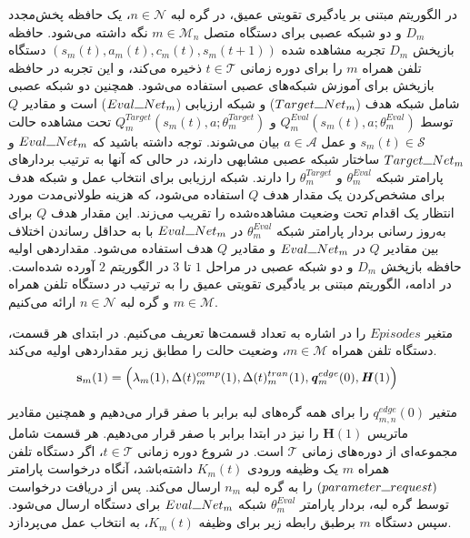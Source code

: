 در الگوریتم مبتنی بر یادگیری تقویتی عمیق، در گره لبه $n \in \mathcal{N}$، یک حافظه پخش‌مجدد $D_m$ و دو شبکه عصبی برای دستگاه متصل $m \in \mathcal{M}_n$ نگه داشته می‌شود. حافظه بازپخش $D_m$ تجربه مشاهده شده $(s_m(t), a_m(t), c_m(t), s_m(t+1))$ دستگاه تلفن همراه $m$ را برای دوره زمانی $t \in \mathcal{T}$ ذخیره می‌کند، و این تجربه در حافظه بازپخش برای آموزش شبکه‌های عصبی استفاده می‌شود. همچنین دو شبکه عصبی شامل شبکه هدف ($Target\rule{0.25cm}{0.15mm}Net_m$) و شبکه ارزیابی ($Eval\rule{0.25cm}{0.15mm}Net_m$) است و مقادیر $Q$ توسط $Q_m^{Eval}(s_m(t), a; \theta_m^{Eval})$ و $Q_m^{Target}(s_m(t), a; \theta_m^{Target})$ تحت مشاهده حالت $s_m(t) \in \mathcal{S}$ و عمل $a \in \mathcal{A}$ بیان می‌شوند. توجه داشته باشید که $Eval\rule{0.25cm}{0.15mm}Net_m$ و $Target\rule{0.25cm}{0.15mm}Net_m$ ساختار شبکه عصبی مشابهی دارند، در حالی که آنها به ترتیب بردارهای پارامتر شبکه $\theta_m^{Eval}$ و $ \theta_m^{Target}$ را دارند. شبکه ارزیابی برای انتخاب عمل و شبکه هدف برای مشخص‌کردن یک مقدار هدف $Q$ استفاده می‌شود، که هزینه طولانی‌مدت مورد انتظار یک اقدام تحت وضعیت مشاهده‌شده را تقریب می‌زند. این مقدار هدف $Q$ برای به‌روز رسانی بردار پارامتر شبکه $\theta_m^{Eval}$ در  $Eval\rule{0.25cm}{0.15mm}Net_m$ با به حداقل رساندن اختلاف بین مقادیر $Q$ در $Eval\rule{0.25cm}{0.15mm}Net_m$ و مقادیر $Q$ هدف استفاده می‌شود. مقداردهی اولیه حافظه بازپخش $D_m$ و دو شبکه عصبی در مراحل $1$ تا $3$ در الگوریتم $2$ آورده شده‌است. در ادامه، الگوریتم مبتنی بر یادگیری تقویتی عمیق را به ترتیب در دستگاه تلفن همراه $m \in \mathcal{M}$ و گره لبه $n \in \mathcal{N}$ ارائه می‌کنیم.


متغیر $Episodes$ را در اشاره به تعداد قسمت‌ها تعریف می‌کنیم. در ابتدای هر قسمت، دستگاه تلفن همراه $m \in \mathcal{M}$، وضعیت حالت را مطابق زیر مقداردهی اولیه می‌کند.
\begin{alignat}{2}
	\textbf{s}_m(1)=\Big(\lambda_m(1), \Delta(t)_m^{comp}(1), \Delta(t)_m^{tran}(1), \textbf{\textit{q}}_m^{edge}(0), \textbf{\textit{H}}(1) \Big)
	\label{21}  
\end{alignat} 



متغیر $q_{m,n}^{edge}(0)$ را برای همه گره‌های لبه برابر با صفر قرار می‌دهیم و همچنین مقادیر ماتریس $\textbf{H}(1)$ را نیز در ابتدا برابر با صفر قرار می‌دهیم. هر قسمت شامل مجموعه‌ای از دوره‌های زمانی $\mathcal{T}$ است. 
در شروع دوره زمانی $t \in \mathcal{T}$، اگر دستگاه تلفن همراه $m$ یک وظیفه ورودی $K_m(t)$ داشته‌باشد، آنگاه درخواست پارامتر $(parameter \rule{0.25cm}{0.15mm} request)$ را به گره لبه $n_m$ ارسال می‌کند. پس از دریافت درخواست توسط گره لبه، بردار پارامتر $\theta_m^{Eval}$ شبکه $Eval\rule{0.25cm}{0.15mm}Net_m$ برای دستگاه ارسال می‌شود. سپس دستگاه $m$ برطبق رابطه زیر برای وظیفه $K_m(t)$، به انتخاب عمل می‌پردازد. 

